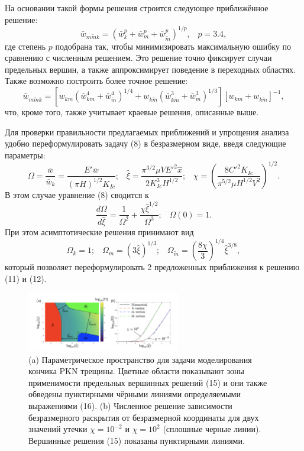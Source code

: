 \documentclass[a4paper, 12pt]{article}
\newcommand{\beq}{\begin{equation}}
\newcommand{\eeq}{\end{equation}}
\begin{document}
На основании такой формы решения строится следующее приближённое решение:
\beq
\bar{w}_{m\tilde{m}k}=\left(\bar{w}_k^p+\bar{w}_m^p+\bar{w}_{\tilde{m}}^p\right)^{1/p},\,\,\,\,\,p=3.4,
\eeq
где степень $p$ подобрана так, чтобы минимизировать максимальную ошибку по сравнению с численным решением.
Это решение точно фиксирует случаи предельных вершин, а также аппроксимирует поведение в переходных областях.
Также возможно построить более точное решение:
\beq
\bar{w}_{m\tilde{m}k}=\left[w_{km}\left(\bar{w}_{km}^4+\bar{w}_{\tilde{m}}^4\right)^{1/4}+w_{k\tilde{m}}\left(\bar{w}_{k\tilde{m}}^3+\bar{w}_m^3\right)^{1/3}\right]\left[w_{km}+w_{k\tilde{m}}\right]^{-1},
\eeq
что, кроме того, также учитывает краевые решения, описанные выше.

Для проверки правильности предлагаемых приближений и упрощения анализа удобно переформулировать задачу (8) в безразмерном виде, введя следующие параметры:
\beq
\Omega=\frac{\bar{w}}{\bar{w}_k}=\frac{E'\bar{w}}{\left(\pi H\right)^{1/2}K_{Ic}};\,\,\,\,\,
\hat{\xi}=\frac{\pi^{3/2}\mu VE'^2\hat{x}}{2K_{Ic}^3H^{1/2}};\,\,\,\,\,
\chi=\left(\frac{8C'^2K_{Ic}}{\pi^{5/2}\mu H^{1/2}V^2}\right)^{1/2}.
\eeq
В этом случае уравнение (8) сводится к
\beq
\frac{d\Omega}{d\hat{\xi}}=\frac{1}{\Omega^2}+\frac{\chi\hat{\xi}^{1/2}}{\Omega^3};\,\,\,\,\,\Omega(0)=1.
\eeq
При этом асимптотические решения принимают вид
\beq
\Omega_k=1;\,\,\,\,\,
\Omega_m=\left(3\hat{\xi}\right)^{1/3};\,\,\,\,\,
\Omega_{\tilde{m}}=\left(\frac{8\chi}{3}\right)^{1/4}\hat{\xi}^{3/8},
\eeq
который позволяет переформулировать 2 предложенных приближения к решению (11) и (12).

\begin{figure}[H]
\center
\includegraphics[width=0.6\textwidth]{Dontsov-2021-fig2}
\caption{(a) Параметрическое пространство для задачи моделирования кончика PKN трещины. Цветные области показывают зоны применимости предельных вершинных решений (15) и они также обведены пунктирными чёрными линиями определяемыми выражениями (16). (b) Численное решение зависимости безразмерного раскрытия от безразмерной координаты для двух значений утечки $\chi=10^{-2}$ и $\chi=10^2$ (сплошные черные линии). Вершинные решения (15) показаны пунктирными линиями.}
\label{fig:Dontsov-2021-fig2}
\end{figure}
\end{document}

